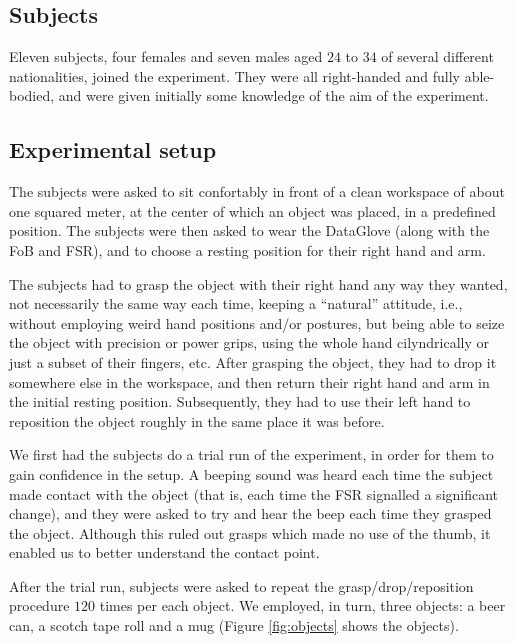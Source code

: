 \subsection*{Subjects}

Eleven subjects, four females and seven males aged $24$ to $34$ of
several different nationalities, joined the experiment. They were all
right-handed and fully able-bodied, and were given initially some
knowledge of the aim of the experiment.

\subsection*{Experimental setup}

The subjects were asked to sit confortably in front of a clean
workspace of about one squared meter, at the center of which an object
was placed, in a predefined position. The subjects were then asked to
wear the DataGlove (along with the FoB and FSR), and to choose a
resting position for their right hand and arm.

The subjects had to grasp the object with their right hand any way
they wanted, not necessarily the same way each time, keeping a
``natural'' attitude, i.e., without employing weird hand positions
and/or postures, but being able to seize the object with precision or
power grips, using the whole hand cilyndrically or just a subset of
their fingers, etc. After grasping the object, they had to drop it
somewhere else in the workspace, and then return their right hand and
arm in the initial resting position. Subsequently, they had to use
their left hand to reposition the object roughly in the same place it
was before.

We first had the subjects do a trial run of the experiment, in order
for them to gain confidence in the setup. A beeping sound was heard
each time the subject made contact with the object (that is, each time
the FSR signalled a significant change), and they were asked to try
and hear the beep each time they grasped the object. Although this
ruled out grasps which made no use of the thumb, it enabled us to
better understand the contact point.

After the trial run, subjects were asked to repeat the
grasp/drop/reposition procedure $120$ times per each object. We
employed, in turn, three objects: a beer can, a scotch tape roll and a
mug (Figure \ref{fig:objects} shows the objects).

